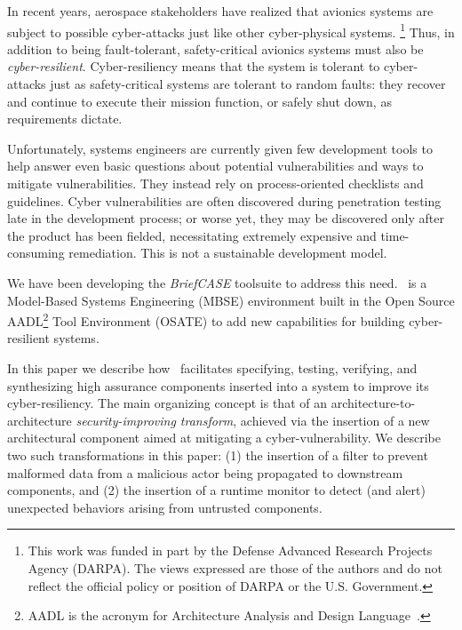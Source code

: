 

In recent years, aerospace stakeholders have realized that avionics
systems are subject to possible cyber-attacks just like other
cyber-physical systems.
%
\footnote{This work was funded in part by the
Defense Advanced Research Projects Agency (DARPA).  The views
expressed are those of the authors and do not reflect the official
policy or position of DARPA or the U.S. Government.}
%
Thus, in addition to being fault-tolerant, safety-critical avionics
systems must also be {\em cyber-resilient}.  Cyber-resiliency means
that the system is tolerant to cyber-attacks just as safety-critical
systems are tolerant to random faults: they recover and continue to
execute their mission function, or safely shut down, as requirements
dictate.

Unfortunately, systems engineers are currently given few development
tools to help answer even basic questions about potential
vulnerabilities and ways to mitigate vulnerabilities.  They instead
rely on process-oriented checklists and guidelines.  Cyber
vulnerabilities are often discovered during penetration testing late
in the development process; or worse yet, they may be discovered only
after the product has been fielded, necessitating extremely expensive
and time-consuming remediation. This is not a sustainable development
model.


We have been developing the {\em BriefCASE} toolsuite to address this need.
\brfcs\ is a Model-Based Systems Engineering (MBSE) environment
built in the Open Source AADL\footnote{AADL is the acronym for
Architecture Analysis and Design Language~\cite{aadl}.}  Tool
Environment (OSATE) to add new capabilities for building
cyber-resilient systems.

In this paper we describe how \brfcs\ facilitates specifying, testing,
verifying, and synthesizing high assurance components inserted into a
system to improve its cyber-resiliency.  The main organizing concept
is that of an architecture-to-architecture \emph{security-improving
transform}, achieved via the insertion of a new architectural
component aimed at mitigating a cyber-vulnerability.  We describe two
such transformations in this paper: (1) the insertion of a
filter to prevent malformed data from a malicious actor being
propagated to downstream components, and (2) the insertion of a
runtime monitor to detect (and alert) unexpected behaviors arising
from untrusted components.

